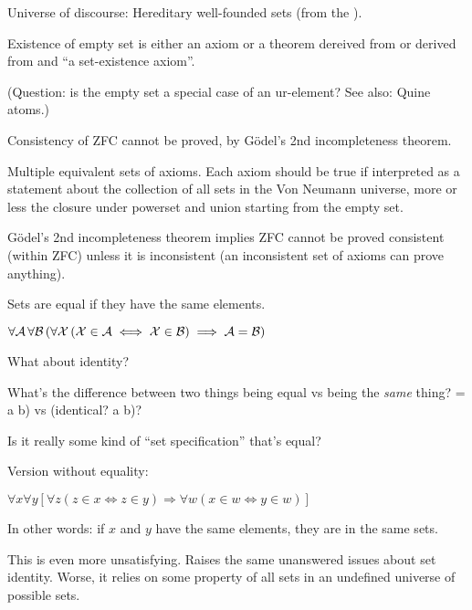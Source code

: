 Universe of discourse: 
Hereditary well-founded sets 
(from the ).

Existence of empty set is either an 
axiom\cite{wiki:AxiomOfEmptySet}
or a theorem dereived from 
or derived from 
and ``a set-existence axiom''.

(Question: is the empty set a special case of an ur-element?
See also: Quine atoms\cite{wiki:Urelement}.)

Consistency of \textsf{ZFC} cannot be proved, 
by G\"{o}del's 2nd incompleteness theorem.

Multiple equivalent sets of axioms.
Each axiom should be true if interpreted as a statement about the
collection of all sets in the Von Neumann 
universe\cite{wiki:VonNeumannUniverse},
more or less the closure under powerset and union starting
from the empty set.

G\"{o}del's 2nd incompleteness theorem implies \textsf{ZFC}
cannot be proved consistent (within \textsf{ZFC}) 
unless it is inconsistent 
(an inconsistent set of axioms can prove anything).


Sets are equal if they have the same 
elements.\cite{wiki:AxiomOfExtensionality,wiki:Extensionality}

$\forall \mathcal{A}\,\forall \mathcal{B}\,
(\forall \mathcal{X}\,(\mathcal{X}\in \mathcal{A}\iff \mathcal{X}\in \mathcal{B})
\implies \mathcal{A}=\mathcal{B})$

What about identity? 

What's the difference between two things being equal vs
being the \textit{same} thing? 
\textsf{= a b)} vs \textsf{(identical? a b)}?

Is it really some kind of ``set specification'' that's equal?

Version without equality:

$\forall x
\forall y
[\forall z(z\in x\Leftrightarrow z\in y)
\Rightarrow 
\forall w(x\in w\Leftrightarrow y\in w)]$

In other words: if $x$ and $y$ have the same elements, 
they are in the same sets.

This is even more unsatisfying. 
Raises the same unanswered issues about set identity.
Worse, it relies on some property of all sets in an undefined 
universe of possible sets.

